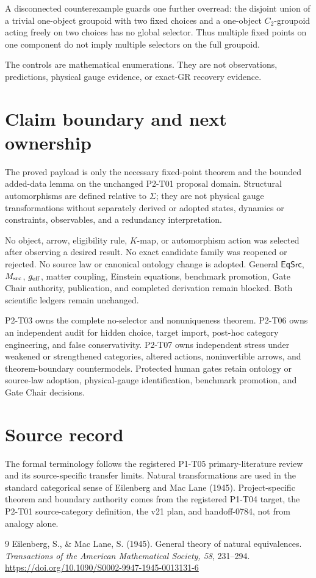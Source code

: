 \documentclass[11pt]{article}
\newcommand{\EqSrc}{\mathsf{EqSrc}}
\begin{document}
A disconnected counterexample guards one further overread: the disjoint union
of a trivial one-object groupoid with two fixed choices and a one-object
\(C_2\)-groupoid acting freely on two choices has no global selector. Thus
multiple fixed points on one component do not imply multiple selectors on the
full groupoid.

The controls are mathematical enumerations. They are not observations,
predictions, physical gauge evidence, or exact-GR recovery evidence.

\section{Claim boundary and next ownership}

The proved payload is only the necessary fixed-point theorem and the bounded
added-data lemma on the unchanged P2-T01 proposal domain. Structural
automorphisms are defined relative to \(\Sigma\); they are not physical gauge
transformations without separately derived or adopted states, dynamics or
constraints, observables, and a redundancy interpretation.

No object, arrow, eligibility rule, \(K\)-map, or automorphism action was
selected after observing a desired result. No exact candidate family was
reopened or rejected. No source law or canonical ontology change is adopted.
General \(\EqSrc\), \(M_{\rm src}\), \(g_{\rm eff}\), matter coupling,
Einstein equations, benchmark promotion, Gate Chair authority, publication,
and completed derivation remain blocked. Both scientific ledgers remain
unchanged.

P2-T03 owns the complete no-selector and nonuniqueness theorem. P2-T06 owns an
independent audit for hidden choice, target import, post-hoc category
engineering, and false conservativity. P2-T07 owns independent stress under
weakened or strengthened categories, altered actions, noninvertible arrows,
and theorem-boundary countermodels. Protected human gates retain ontology or
source-law adoption, physical-gauge identification, benchmark promotion, and
Gate Chair decisions.

\section{Source record}

The formal terminology follows the registered P1-T05 primary-literature
review and its source-specific transfer limits. Natural transformations are
used in the standard categorical sense of Eilenberg and Mac Lane (1945).
Project-specific theorem and boundary authority comes from the registered
P1-T04 target, the P2-T01 source-category definition, the v21 plan, and
handoff-0784, not from analogy alone.

\begin{thebibliography}{9}
Eilenberg, S., \& Mac Lane, S. (1945). General theory of natural
equivalences. \emph{Transactions of the American Mathematical Society, 58},
231--294. \url{https://doi.org/10.1090/S0002-9947-1945-0013131-6}
\end{thebibliography}
\end{document}
